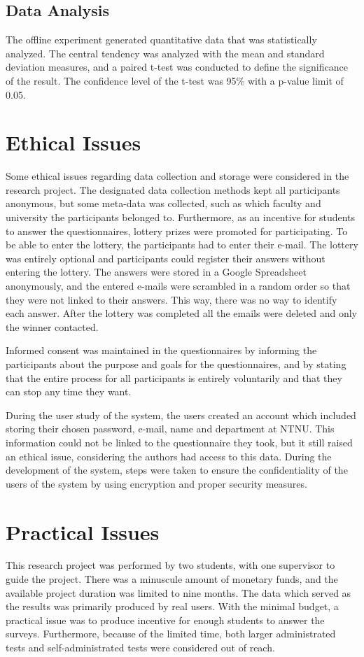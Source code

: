 \subsection*{Data Analysis}
The offline experiment generated quantitative data that was statistically analyzed. The central tendency was analyzed with the mean and standard deviation measures, and a paired t-test was conducted to define the significance of the result. The confidence level of the t-test was 95\% with a p-value limit of 0.05.

\section{Ethical Issues}
Some ethical issues regarding data collection and storage were considered in the research project. The designated data collection methods kept all participants anonymous, but some meta-data was collected, such as which faculty and university the participants belonged to. Furthermore, as an incentive for students to answer the questionnaires, lottery prizes were promoted for participating. To be able to enter the lottery, the participants had to enter their e-mail. The lottery was entirely optional and participants could register their answers without entering the lottery. The answers were stored in a Google Spreadsheet anonymously, and the entered e-mails were scrambled in a random order so that they were not linked to their answers. This way, there was no way to identify each answer. After the lottery was completed all the emails were deleted and only the winner contacted. 

Informed consent was maintained in the questionnaires by informing the participants about the purpose and goals for the questionnaires, and by stating that the entire process for all participants is entirely voluntarily and that they can stop any time they want.

During the user study of the system, the users created an account which included storing their chosen password, e-mail, name and department at NTNU. This information could not be linked to the questionnaire they took, but it still raised an ethical issue, considering the authors had access to this data. During the development of the system, steps were taken to ensure the confidentiality of the users of the system by using encryption and proper security measures.


\section{Practical Issues}
This research project was performed by two students, with one supervisor to guide the project. There was a minuscule amount of monetary funds, and the available project duration was limited to nine months. The data which served as the results was primarily produced by real users. With the minimal budget, a practical issue was to produce incentive for enough students to answer the surveys. Furthermore, because of the limited time, both larger administrated tests and self-administrated tests were considered out of reach.

\cleardoublepage




